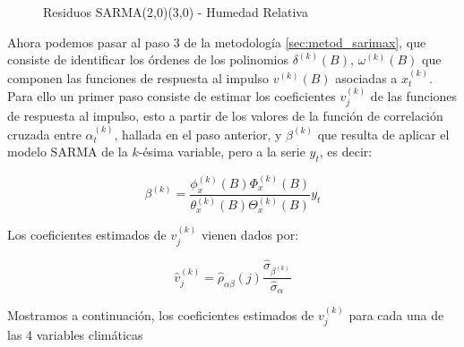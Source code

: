 \documentclass[12pt,oneside]{book}\usepackage[]{graphicx}\usepackage[]{color}
\newenvironment{knitrout}{}{} %
\theoremstyle{definition} %
\begin{document}
\begin{enumerate}
\begin{knitrout}
\begin{figure}[H]
{}

\caption{\label{fig:sarma_humed} Residuos SARMA(2,0)(3,0) - Humedad Relativa}\label{fig:unnamed-chunk-38}
\end{figure}


\end{knitrout}


\end{enumerate}













Ahora podemos pasar al paso 3 de la metodología \ref{sec:metod_sarimax}, que consiste de identificar los órdenes de los polinomios $\delta^{(k)}(B)$, $\omega^{(k)}(B)$ que componen las funciones de respuesta al impulso $v^{(k)}(B)$ asociadas a $x_t^{(k)}$. Para ello un primer paso consiste de estimar los coeficientes $v_j^{(k)}$ de las funciones de respuesta al impulso, esto a partir de los valores de la función de correlación cruzada entre $\alpha_t^{(k)}$, hallada  en el paso anterior, y $\beta^{(k)}$ que resulta de aplicar el modelo SARMA de la $k$-ésima variable, pero a la serie $y_t$, es decir:

$$\beta^{(k)} = \frac{ \phi_x^{(k)}(B) \Phi_x^{(k)}(B) }{\theta_x^{(k)}(B) \Theta_x^{(k)}(B)} y_t$$


Los coeficientes estimados de $v_j^{(k)}$ vienen dados por:

$$\hat v_j^{(k)} = \hat\rho_{\alpha\beta}(j) \frac{\hat\sigma_{\beta^{(k)}}}{\hat\sigma_\alpha} $$

Mostramos a continuación, los coeficientes estimados de $v_j^{(k)}$ para cada una de las 4 variables climáticas
\end{document}
